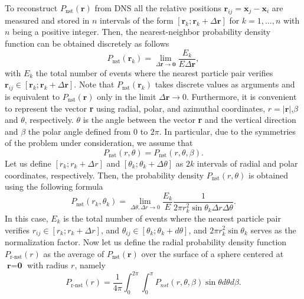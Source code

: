 \documentclass[11pt]{My_preprint}
\begin{document}
To reconstruct $P_\text{nst}(\textbf{r})$ from DNS all the relative positions $\textbf{r}_{ij}  = \textbf{x}_j - \textbf{x}_i$ are measured and stored in $n$ intervals of the form $[\textbf{r}_k; \textbf{r}_k+\Delta \textbf{r}]$ for $k = 1,\ldots, n$ with $n$ being a positive integer.
Then, the nearest-neighbor probability density function can be obtained discretely as follows
\begin{equation}
    P_\text{nst}(\textbf{r}_k)
    =\lim_{\Delta \textbf{r} \to \bm 0} \frac{E_k}{E \Delta \textbf{r}},
    \label{eq:vec_cond}
\end{equation}
with $E_k$ the total number of events where the nearest particle pair verifies $\textbf{r}_{ij} \in [\textbf{r}_k ; \textbf{r}_k + \Delta \textbf{r}]$.
Note that $P_\text{nst}(\textbf{r}_k)$ takes discrete values as arguments and is equivalent to $P_\text{nst}(\textbf{r})$ only in the limit $\Delta \textbf{r} \to 0$. 
Furthermore, it is convenient to represent the vector \textbf{r} using radial, polar, and azimuthal coordinates,  $r = |\textbf{r}|$,$\beta$ and $\theta$, respectively. 
$\theta$ is the angle between the vector \textbf{r} and the vertical direction and $\beta$ the polar angle defined from $0$ to $2\pi$. 
In particular, due to the symmetries of the problem under consideration, we assume that
\begin{equation}
    P_\text{nst}(r,\theta)
    = P_\text{nst}(r,\theta,\beta). 
\end{equation}
Let us define $[r_k; r_k+\Delta r]$ and $[\theta_k; \theta_k+\Delta \theta]$  as $2k$ intervals of radial and polar coordinates, respectively. 
Then, the probability density $P_\text{nst}(r,\theta)$ is obtained using the following formula
\begin{equation}
    P_\text{nst}(r_k,\theta_k)
    =
    \lim_{\Delta \theta , \Delta r \to 0}
\frac{E_k}{E}
    \frac{1}{2\pi  r_k^2 \sin \theta_k \Delta r \Delta \theta}.
    \label{eq:Ptheta_r}
\end{equation}
In this case, $E_k$ is the total number of events where the nearest particle pair verifies $r_{ij} \in [r_k ; r_k + \Delta r]$, and $\theta_{ij} \in [\theta_k; \theta_k+d\theta]$, and $2\pi  r_k^2 \sin \theta_k$ serves as the normalization factor. 
Now let us define the radial probability density function  $P_\text{r-nst}(r)$ as the average of $P_\text{nst}(\textbf{r})$ over the surface of a sphere centered at $\textbf{r}=\textbf{0}$ with radius $r$, namely
\begin{equation}
    P_\text{r-nst}(r) = \frac{1}{4\pi }\int_{0}^{2\pi}\int_{0}^{\pi} P_{nst}(r,\theta ,\beta) \sin\theta d\theta d\beta.
    \label{eq:P_r}
\end{equation}
\end{document}
